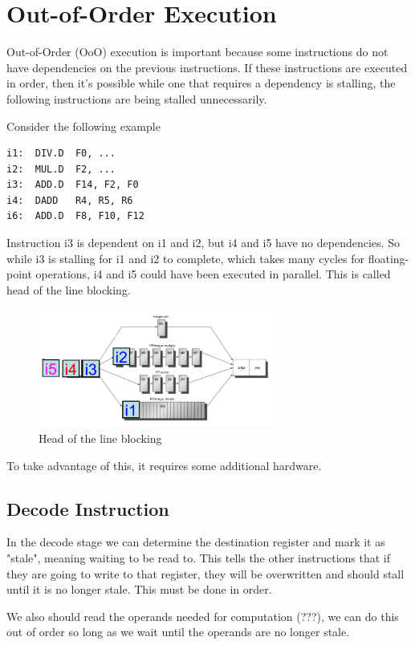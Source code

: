\documentclass{article}
\begin{document}
\section{Out-of-Order Execution}

Out-of-Order (OoO) execution is important because some instructions do not have dependencies on the previous instructions. If these instructions are executed in order, then it's possible while one that requires a dependency is stalling, the following instructions are being stalled unnecessarily. 

Consider the following example
\begin{Verbatim}
i1:  DIV.D  F0, ...
i2:  MUL.D  F2, ...
i3:  ADD.D  F14, F2, F0
i4:  DADD   R4, R5, R6
i6:  ADD.D  F8, F10, F12
\end{Verbatim}

Instruction i3 is dependent on i1 and i2, but i4 and i5 have no dependencies. So while i3 is stalling for i1 and i2 to complete, which takes many cycles for floating-point operations, i4 and i5 could have been executed in parallel. This is called head of the line blocking.

\begin{figure}[ht!]
\centering
\includegraphics[width=80mm]{img/HOLB.png}
\caption{Head of the line blocking}
\end{figure}

To take advantage of this, it requires some additional hardware. 


\subsection{Decode Instruction}

In the decode stage we can determine the destination register and mark it as "stale", meaning waiting to be read to. This tells the other instructions that if they are going to write to that register, they will be overwritten and should stall until it is no  longer stale. This must be done in order.

We also should read the operands needed for computation (???),  we can do this out of order so long as we wait until the operands are no longer stale.
\end{document}
